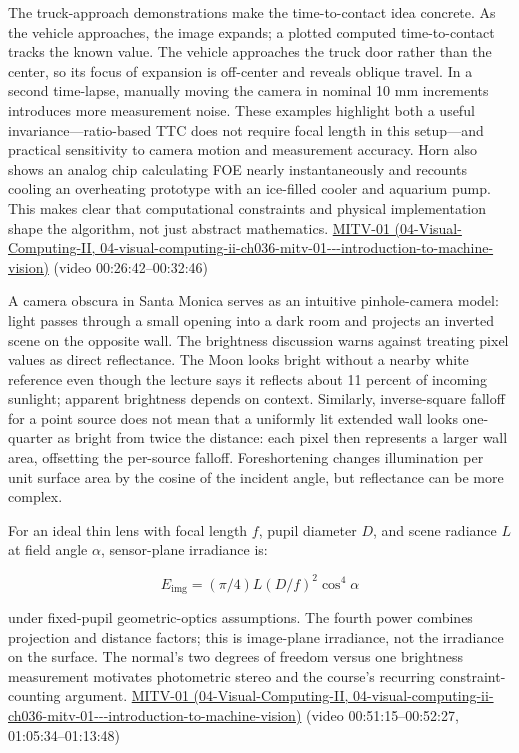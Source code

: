 The truck-approach demonstrations make the time-to-contact idea concrete. As the vehicle approaches, the image expands; a plotted computed time-to-contact tracks the known value. The vehicle approaches the truck door rather than the center, so its focus of expansion is off-center and reveals oblique travel. In a second time-lapse, manually moving the camera in nominal 10 mm increments introduces more measurement noise. These examples highlight both a useful invariance---ratio-based TTC does not require focal length in this setup---and practical sensitivity to camera motion and measurement accuracy. Horn also shows an analog chip calculating FOE nearly instantaneously and recounts cooling an overheating prototype with an ice-filled cooler and aquarium pump. This makes clear that computational constraints and physical implementation shape the algorithm, not just abstract mathematics. \href{../04-Visual-Computing-II/main.pdf\#nameddest=04-visual-computing-ii-ch036-mitv-01---introduction-to-machine-vision}{MITV-01 (04-Visual-Computing-II, 04-visual-computing-ii-ch036-mitv-01-\/-\/-introduction-to-machine-vision)} (video 00:26:42--00:32:46)

A camera obscura in Santa Monica serves as an intuitive pinhole-camera model: light passes through a small opening into a dark room and projects an inverted scene on the opposite wall. The brightness discussion warns against treating pixel values as direct reflectance. The Moon looks bright without a nearby white reference even though the lecture says it reflects about 11 percent of incoming sunlight; apparent brightness depends on context. Similarly, inverse-square falloff for a point source does not mean that a uniformly lit extended wall looks one-quarter as bright from twice the distance: each pixel then represents a larger wall area, offsetting the per-source falloff. Foreshortening changes illumination per unit surface area by the cosine of the incident angle, but reflectance can be more complex.

For an ideal thin lens with focal length \(f\), pupil diameter \(D\), and scene radiance \(L\) at field angle \(\alpha\), sensor-plane irradiance is:

\[E_{\mathrm{img}}=(\pi/4)L(D/f)^2\cos^4\alpha\]

under fixed-pupil geometric-optics assumptions. The fourth power combines projection and distance factors; this is image-plane irradiance, not the irradiance on the surface. The normal's two degrees of freedom versus one brightness measurement motivates photometric stereo and the course's recurring constraint-counting argument. \href{../04-Visual-Computing-II/main.pdf\#nameddest=04-visual-computing-ii-ch036-mitv-01---introduction-to-machine-vision}{MITV-01 (04-Visual-Computing-II, 04-visual-computing-ii-ch036-mitv-01-\/-\/-introduction-to-machine-vision)} (video 00:51:15--00:52:27, 01:05:34--01:13:48)

